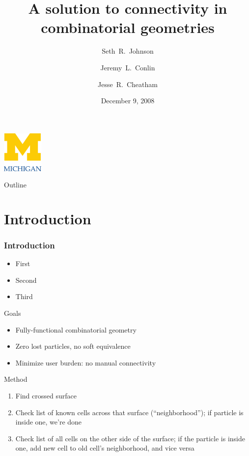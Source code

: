 \documentclass{beamer}
\title[MCGeometry]%
{A solution to connectivity in combinatorial geometries}
\author[SRJ, JLC, JRC]{Seth~R.~Johnson \and Jeremy~L.~Conlin \and Jesse~R.~Cheatham}
\institute[UM]{
University of Michigan, Ann Arbor
}
\date[Project presentation]{December 9, 2008}
\begin{document}

\begin{frame}
\titlepage
\begin{center}
  \includegraphics[width=2cm]{umlogo}
\end{center}
\end{frame}

\begin{frame}{Outline}
\tableofcontents
\end{frame}

\section{Introduction}
\begin{frame}
  \frametitle{Introduction}
  \begin{itemize}
  \item First
  \item Second
  \item Third
\end{itemize}
\end{frame}
\begin{frame}{Goals}
\begin{itemize}
  \item Fully-functional combinatorial geometry
  \item Zero lost particles, no soft equivalence
  \item Minimize user burden: no manual connectivity
\end{itemize}
\end{frame}
\begin{frame}{Method}
\begin{enumerate}
  \item Find crossed surface
  \item Check list of known cells across that surface (``neighborhood'');
    if particle is inside one, we're done
  \item Check list of all cells on the other side of the surface; if the
    particle is inside one, add new cell to old cell's neighborhood, and
    vice versa
\end{enumerate}
\end{frame}
\end{document}
